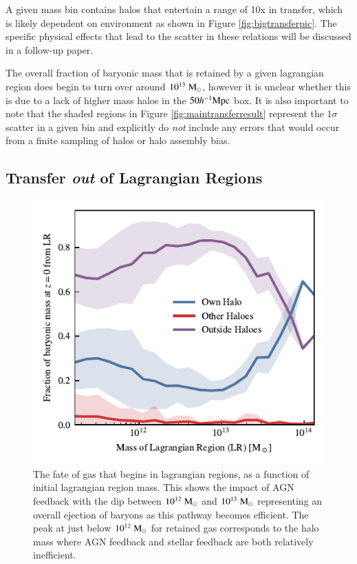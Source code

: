 A given mass bin contains halos that entertain a range of 10x in transfer,
which is likely dependent on environment as shown in Figure
\ref{fig:bigtransferpic}. The specific physical effects that lead to the
scatter in these relations will be discussed in a follow-up paper.

The overall fraction of baryonic mass that is retained by a given lagrangian
region does begin to turn over around $10^{13} \;{\rm M}_{\odot}{}$, however it is unclear
whether this is due to a lack of higher mass halos in the $50 h^{-1}{\rm Mpc}{}$ box. It
is also important to note that the shaded regions in Figure
\ref{fig:maintransferresult} represent the $1\sigma$ scatter in a given bin
and explicitly do \emph{not} include any errors that would occur from a finite
sampling of halos or halo assembly bias.

\subsection{Transfer \emph{out} of Lagrangian Regions}

\begin{figure}
	\centering
	\includegraphics{figures/s50j7kAHF/inverse_component_fraction.pdf}
	\vspace{-0.7cm}
	\caption{The fate of gas that begins in lagrangian regions, as a function of
	initial lagrangian region mass. This shows the impact of AGN
	feedback with the dip between $10^{12}\;{\rm M}_{\odot}{}$ and $10^{13}\;{\rm M}_{\odot}{}$
	representing an overall ejection of baryons as this pathway
	becomes efficient. The peak at just below $10^{12}\;{\rm M}_{\odot}{}$
	for retained gas corresponds to the halo mass where AGN feedback
	and stellar feedback are both relatively inefficient.}
	\label{fig:transferoutoflrs}
\end{figure}

